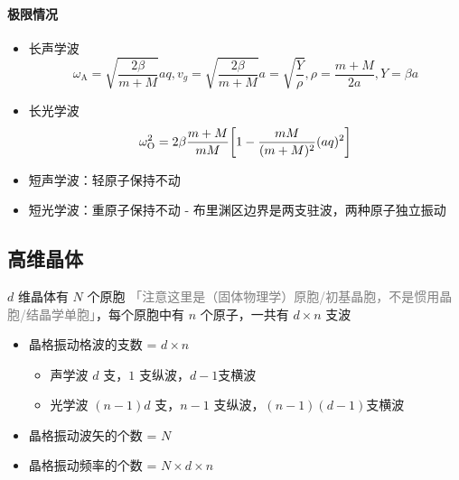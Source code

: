 \paragraph{极限情况}

\begin{itemize}
    \item 长声学波 \[ \omega_{\text{A}} = \sqrt{\frac{2 \beta}{m + M}} a q, v_g = \sqrt{\frac{2 \beta}{m + M}} a = \sqrt{\frac{Y}{\rho}}, \rho = \frac{m + M}{2 a}, Y = \beta a \]
    \item 长光学波 \[ \omega_{\text{O}}^2 = 2 \beta \frac{m + M}{m M} \qty[1 - \frac{m M}{(m + M)^2} (a q)^2] \]
    \item 短声学波：轻原子保持不动
    \item 短光学波：重原子保持不动 - 布里渊区边界是两支驻波，两种原子独立振动
\end{itemize}

\subsection{高维晶体}

$d$ 维晶体有 $N$ 个原胞 \textcolor{gray}{「注意这里是（固体物理学）原胞/初基晶胞，不是惯用晶胞/结晶学单胞」}，每个原胞中有 $n$ 个原子，一共有 $d \times n$ 支波
\begin{itemize}
    \item 晶格振动格波的支数 = $d \times n$ \begin{itemize}
              \item 声学波 $d$ 支，$1$ 支纵波，$d - 1$支横波
              \item 光学波 $(n - 1) d$ 支，$n - 1$ 支纵波，$(n - 1) (d - 1)$支横波
          \end{itemize}
    \item 晶格振动波矢的个数 = $N$
    \item 晶格振动频率的个数 = $N \times d \times n$
\end{itemize}


